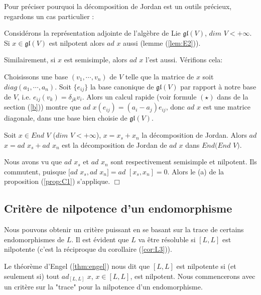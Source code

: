 \documentclass[a4paper,openany,12pt]{report}
\newcommand{\gl}{\mathfrak{gl}}
\theoremstyle{break}
{\theorembodyfont{\upshape}
\newtheorem*{rmq}{Remarque :}
\newtheorem*{prv}{Preuve :}
\newtheorem*{ex}{Exemples :}
\newtheorem*{exe}{Exemple : }
\newtheorem*{nota}{Notation :}
\newtheorem*{dem}{D\'emonstration :}}
\begin{document}
Pour préciser pourquoi la décomposition de Jordan est un outils précieux, regardons un cas particulier :

\begin{ex}
\quad Considérons la représentation adjointe de l'algèbre de Lie $\gl(V)$, $dim$ $V < +\infty$. Si $x \in \gl(V)$ est nilpotent alors $ad$ $x$ aussi (lemme (\ref{lem:E2})).

Similairement, si $x$ est semisimple, alors $ad$ $x$ l'est aussi. Vérifions cela: 

Choisissons une base $(v_{1},\cdots,v_{n})$ de $V$ telle que la matrice de $x$ soit $diag(a_{1},\cdots,a_{n})$. Soit $\{ e_{ij} \}$ la base canonique de $\gl(V)$ par rapport à notre base de $V$, i.e. $e_{ij}(v_{k})=\delta_{jk}v_{i}$. Alors un calcul rapide (voir formule $(\star)$ dans de la section (\ref{b})) montre que $ad$ $x(e_{ij})=(a_{i}-a_{j})e_{ij}$, donc $ad$ $x$ est une matrice diagonale, dans une base bien choisie de $\gl(V)$. 
\end{ex}

\begin{lem}\label{lem:C1}
\quad Soit $x \in End$ $V$ ($dim$ $V < +\infty$), $x=x_{s}+x_{n}$ la décomposition de Jordan. Alors $ad$ $x = ad$ $x_{s}+ad$ $x_{n}$ est la décomposition de Jordan de $ad$ $x$ dans $End(End$ $V)$. 
\end{lem}

\begin{prv}
\quad Nous avons vu que $ad$ $x_{s}$ et $ad$ $x_{n}$ sont respectivement semisimple et nilpotent. Ils commutent, puisque $[ad$ $x_{s},ad$ $x_{n}] = ad$ $[x_{s},x_{n}]=0$. Alors le (a) de la proposition (\ref{prop:C1}) s'applique. $\Box$
\end{prv}

\subsection{Critère de nilpotence d'un endomorphisme}\label{a}

Nous pouvons obtenir un critère puissant en se basant sur la trace de certains endomorphismes de $L$. Il est évident que $L$ va être résoluble si $[L,L]$ est nilpotente (c'est la réciproque du corollaire (\ref{cor:L3})).

Le théorème d'Engel (\ref{thm:engel}) nous dit que $[L,L]$ est nilpotente si (et seulement si) tout $ad_{[L,L]}$ $x$, $x \in [L,L]$, est nilpotent. Nous commencerons avec un critère sur la "trace" pour la nilpotence d'un endomorphisme.
\end{document}
